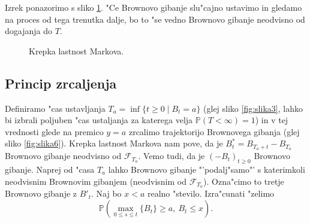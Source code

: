 \documentclass[twoside,11pt]{article}
\begin{document}
Izrek ponazorimo s sliko \ref{fig:slika5}. "Ce Brownovo gibanje slu"cajno ustavimo in gledamo na proces od tega trenutka dalje, bo to "se vedno Brownovo gibanje neodvisno od dogajanja do $T$. 

\begin{figure}[h]
    \centering
    \caption{Krepka lastnost Markova.}
    \label{fig:slika5}
\end{figure}


\subsection{Princip zrcaljenja}

Definiramo "cas ustavljanja $T_a = \inf\{t \geq 0 \mid B_t = a\}$ (glej sliko \ref{fig:slika3}, lahko bi izbrali poljuben "cas ustaljanja za katerega velja $\mathbb{P}(T < \infty) = 1$) in v tej vrednosti glede na premico $y = a$ zrcalimo trajektorijo Brownovega gibanja (glej sliko \ref{fig:slika6}). 
Krepka lastnost Markova nam pove, da je $B^*_t = B_{T_a + t} - B_{T_a}$ Brownovo gibanje neodvisno od $\mathcal{F}_{T_a}$. Vemo tudi, da je $(-B_t)_{t\geq0}$ Brownovo gibanje. Naprej od "casa $T_a$ lahko Brownovo gibanje "'podalj"samo"' s katerimkoli neodvisnim Brownovim gibanjem (neodvisnim od $\mathcal{F}_{T_a}$). Ozna"cimo to tretje Brownovo gibanje z $B'_t$. Naj bo $x<a$ realno "stevilo. Izra"cunati "zelimo 
$$
    \mathbb{P}\left(\max_{0\leq s\leq t}\{B_t\}\geq a, \ B_t \leq x\right).
$$
\end{document}

